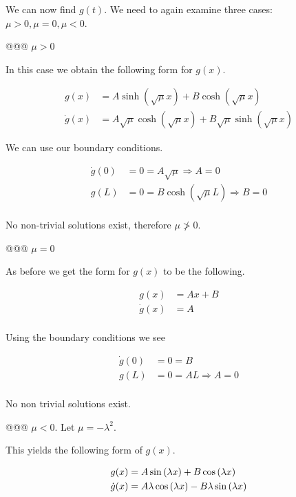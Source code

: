 \documentclass[10pt]{article}
\begin{document}
\begin{easylist}[enumerate]
    We can now find $g(t)$. We need to again examine three cases: $\mu > 0, \mu = 0, \mu < 0$.

    @@@ $\mu > 0$

    In this case we obtain the following form for $g(x)$.

    \begin{align*}
        g(x) &= A \sinh(\sqrt{\mu}x) + B \cosh(\sqrt{\mu}x)\\
        \dot{g}(x) &= A \sqrt{\mu} \cosh{\left (\sqrt{\mu} x \right )} + B \sqrt{\mu} \sinh{\left (\sqrt{\mu} x \right)}
    \end{align*}

    We can use our boundary conditions.

    \begin{align*}
        \dot{g}(0) &= 0 = A \sqrt{\mu} \Rightarrow A = 0\\
        g(L) &= 0 = B \cosh(\sqrt{\mu}L) \Rightarrow B = 0\\
    \end{align*}

    No non-trivial solutions exist, therefore $\mu \not> 0$.

    @@@ $\mu = 0$

    As before we get the form for $g(x)$ to be the following.

    \begin{align*}
        g(x) &= Ax + B\\
        \dot{g}(x) &= A\\
    \end{align*}

    Using the boundary conditions we see

    \begin{align*}
        \dot{g}(0) &= 0 = B\\
        g(L) &= 0 = AL \Rightarrow A = 0\\
    \end{align*}

    No non trivial solutions exist.

    @@@ $\mu < 0$. Let $\mu = - \lambda^2$.

    This yields the following form of $g(x)$.

    \begin{align*}
        g(x) &= A \sin\left( \lambda x \right) + B \cos\left( \lambda x \right)\\
        \dot{g}(x) &= A \lambda \cos\left( \lambda x \right) - B \lambda \sin\left( \lambda x \right)\\
    \end{align*}


\end{easylist}
\end{document}
